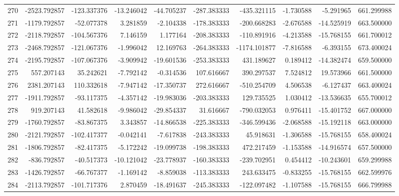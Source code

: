 \begin{tabular}{lrrrrrrrrr}
270 &  -2523.792857 &  -123.337376 & -13.246042 & -44.705237 &  -287.383333 &  -435.321115 &  -1.730588 &  -5.291965 &  661.299988 \\
271 &  -1179.792857 &   -52.077378 &   3.281859 &  -2.104338 &  -178.383333 &  -200.668283 &  -2.676588 & -14.525919 &  663.500000 \\
272 &  -2118.792857 &  -104.567376 &   7.146159 &   1.177164 &  -208.383333 &  -110.891916 &  -4.213588 & -15.768155 &  661.700012 \\
273 &  -2468.792857 &  -121.067376 &  -1.996042 &  12.169763 &  -264.383333 & -1174.101877 &  -7.816588 &  -6.393155 &  673.400024 \\
274 &  -2195.792857 &  -107.067376 &  -3.909942 & -19.601536 &  -253.383333 &   431.189627 &   0.189412 & -14.382474 &  659.500000 \\
275 &    557.207143 &    35.242621 &  -7.792142 &  -0.314536 &   107.616667 &   390.297537 &   7.524812 &  19.573966 &  661.500000 \\
276 &   2381.207143 &   110.332618 &  -7.947142 & -17.350737 &   272.616667 &  -510.254709 &   4.506538 &  -6.127437 &  663.400024 \\
277 &  -1911.792857 &   -93.117375 &  -4.357142 & -19.983036 &  -203.383333 &   129.735525 &   1.030412 & -13.536635 &  655.700012 \\
278 &    919.207143 &    41.582618 &  -9.986042 & -29.854337 &    31.616667 &  -790.032053 &   0.976411 & -15.401752 &  667.000000 \\
279 &  -1760.792857 &   -83.867375 &   3.343857 & -14.866538 &  -225.383333 &  -346.599436 &  -2.068588 & -15.192118 &  663.000000 \\
280 &  -2121.792857 &  -102.417377 &  -0.042141 &  -7.617838 &  -243.383333 &    45.918631 &  -1.306588 & -15.768155 &  658.400024 \\
281 &  -1806.792857 &   -82.417375 &  -5.172242 & -19.099738 &  -198.383333 &   472.217459 &  -1.153588 & -14.916574 &  657.500000 \\
282 &   -836.792857 &   -40.517373 & -10.121042 & -23.778937 &  -160.383333 &  -239.702951 &   0.454412 & -10.243601 &  659.299988 \\
283 &  -1426.792857 &   -66.767377 &  -1.169142 &  -8.859038 &  -113.383333 &   243.633475 &  -0.833255 & -15.768155 &  662.599976 \\
284 &  -2113.792857 &  -101.717376 &   2.870459 & -18.491637 &  -245.383333 &  -122.097482 &  -1.107588 & -15.768155 &  666.799988 \\

\end{tabular}
